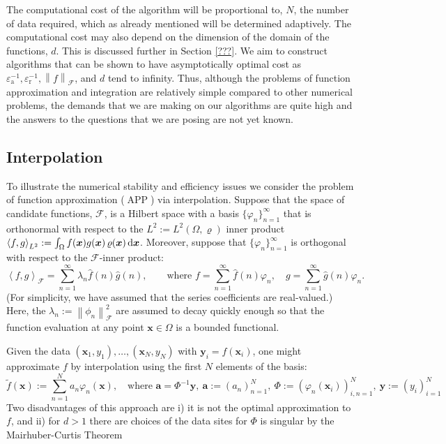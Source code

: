 \documentclass[11pt]{NSFamsart}
\newcommand{\hatf}{\hat{f}}
\newcommand{\hatg}{\hat{g}}
\newcommand{\tf}{\tilde{f}}
\newcommand{\mPhi}{\mathsf{\Phi}}
\DeclareMathOperator{\APP}{APP}
\newcommand{\ba}{{\boldsymbol{a}}}
\newcommand{\bx}{{\boldsymbol{x}}}
\newcommand{\by}{{\boldsymbol{y}}}
\def\dif{\textup{d}}
\newcommand{\calf}{{\mathcal{F}}}
\newcommand{\norm}[2][{}]{\ensuremath{\left \lVert #2 \right \rVert}_{#1}}
\newcommand{\ip}[3][{}]{\ensuremath{\left \langle #2, #3 \right \rangle_{#1}}}
\newcommand{\abstol}{\varepsilon_{\text{a}}}
\newcommand{\reltol}{\varepsilon_{\text{r}}}
\begin{document}
The computational cost of the algorithm will be proportional to, $N$, the number of data required, which as already mentioned will be determined adaptively. The computational cost may also depend on the dimension of the domain of the functions, $d$.  This is discussed further in Section \ref{???}.  We aim to construct algorithms that can be shown to have asymptotically optimal cost as $\abstol^{-1}, \reltol^{-1}, \norm[\calf]{f}$, and $d$ tend to infinity.  Thus, although the problems of function approximation and integration are relatively simple compared to other numerical problems, the demands that we are making on our algorithms are quite high and the answers to the questions that we are posing are not yet known.

\subsection*{Interpolation}
To illustrate the numerical stability and efficiency issues we consider the problem of function approximation ($\APP$) via interpolation.  
Suppose that the space of candidate functions, $\calf$, is a Hilbert space with a basis $\{\varphi_n\}_{n=1}^{\infty}$ that is orthonormal with respect to the $L^2:=L^2(\Omega, \varrho)$ inner product $\ip[L^2]{f}{g} := \int_{\Omega} f(\bx) g(\bx) \, \varrho(\bx) \, \dif \bx$.  Moreover, suppose that $\{\varphi_n\}_{n=1}^{\infty}$ is orthogonal with respect to the $\calf$-inner product: 
\begin{equation}
\ip[\calf]{f}{g}=\sum_{n=1}^{\infty} \lambda_n \hatf(n)\hatg(n), \qquad \text{where }  f=\sum_{n=1}^{\infty} \hatf(n) \varphi_n, \quad g=\sum_{n=1}^{\infty} \hatg(n) \varphi_n.
\end{equation}
(For simplicity, we have assumed that the series coefficients are real-valued.)  Here, the $\lambda_n:=\norm[\calf]{\phi_n}^2$ are assumed to decay quickly enough so that the function evaluation at any point $\bx \in \Omega$ is a bounded functional.

Given the data $(\bx_1,y_1), \ldots, (\bx_N,y_N)$ with $\by_i=f(\bx_i)$, one might approximate $f$ by interpolation using the first $N$ elements of the basis:
\[
\tf(\bx) := \sum_{n=1}^N a_n \varphi_n(\bx), \quad \text{where }\ba=\mPhi^{-1} \by, \ \ba:=(a_n)_{n=1}^{N}, \ \mPhi:=(\varphi_n(\bx_i))_{i,n=1}^{N}, \ \by:=(y_i)_{i=1}^{N}
\]
Two disadvantages of this approach are i) it is not the optimal approximation to $f$, and ii) for $d>1$ there are choices of the data sites for $\mPhi$ is singular by the Mairhuber-Curtis Theorem \cite{???}
\end{document}
